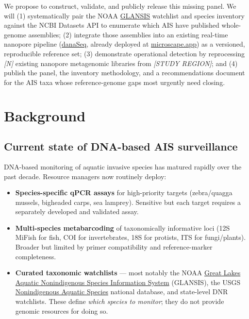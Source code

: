 \documentclass[11pt, letterpaper]{article}
\newcommand{\placeholder}[1]{\textcolor{mutedgray}{\textit{[#1]}}}
\begin{document}
We propose to construct, validate, and publicly release this missing panel. We will (1) systematically pair the NOAA \href{https://www.glerl.noaa.gov/glansis/}{GLANSIS} watchlist and species inventory against the NCBI Datasets API to enumerate which AIS have published whole-genome assemblies; (2) integrate those assemblies into an existing real-time nanopore pipeline (\href{https://github.com/rec3141/danaSeq}{danaSeq}, already deployed at \href{https://microscape.app/}{microscape.app}) as a versioned, reproducible reference set; (3) demonstrate operational detection by reprocessing \placeholder{N} existing nanopore metagenomic libraries from \placeholder{STUDY REGION}; and (4) publish the panel, the inventory methodology, and a recommendations document for the AIS taxa whose reference-genome gaps most urgently need closing.

\section{Background}

\subsection{Current state of DNA-based AIS surveillance}

DNA-based monitoring of aquatic invasive species has matured rapidly over the past decade. Resource managers now routinely deploy:

\begin{itemize}[leftmargin=1.5em]
  \item \textbf{Species-specific qPCR assays} for high-priority targets (zebra/quagga mussels, bigheaded carps, sea lamprey). Sensitive but each target requires a separately developed and validated assay.
  \item \textbf{Multi-species metabarcoding} of taxonomically informative loci (12S MiFish for fish, COI for invertebrates, 18S for protists, ITS for fungi/plants). Broader but limited by primer compatibility and reference-marker completeness.
  \item \textbf{Curated taxonomic watchlists} --- most notably the NOAA \href{https://www.glerl.noaa.gov/glansis/}{Great Lakes Aquatic Nonindigenous Species Information System} (GLANSIS), the USGS \href{https://nas.er.usgs.gov/}{Nonindigenous Aquatic Species} national database, and state-level DNR watchlists. These define \emph{which species to monitor}; they do not provide genomic resources for doing so.
\end{itemize}
\end{document}
